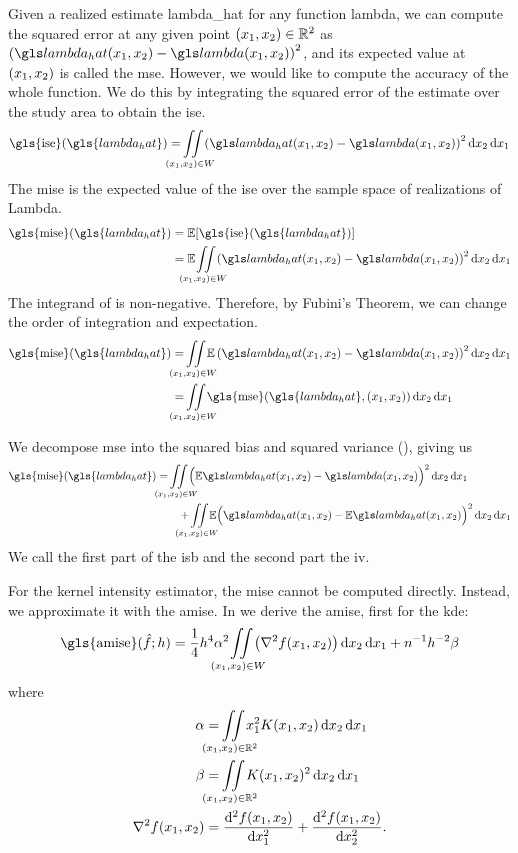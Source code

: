 Given a realized estimate \gls{lambda_hat} for any function \gls{lambda},
we can compute the squared error at any given point $(x_1, x_2) \in \mathbb{R}^2$ as
$\left( \lmbdhat - \lmbd \right)^2$,
and its expected value at $(x_1, x_2)$ is called the \gls{mse}.
However,
we would like to compute the accuracy of the whole function.
We do this by integrating the squared error of the estimate over the study area to obtain the \gls{ise}.
\begin{equation}
\label{eq:ise}
    \mbox{\gls{ise}}(\gls{lambda_hat}) = \iintW{
            \left( \lmbdhat - \lmbd \right)^2
    }
\end{equation}
The \gls{mise} is the expected value of the \gls{ise} over the sample space of realizations of \gls{Lambda}.
\begin{align}
    \mbox{\gls{mise}}(\gls{lambda_hat}) 
        & = \E [\mbox{\gls{ise}}(\gls{lambda_hat})] \nonumber \\
        & = \E \iintW{ \left( \lmbdhat - \lmbd \right)^2 } \label{eq:mise}
\end{align}
The integrand of  is non-negative.
Therefore, by Fubini's Theorem, we can change the order of integration and expectation.
\begin{align}
    \mbox{\gls{mise}}(\gls{lambda_hat}) 
        & = \iintW{ \E \left( \lmbdhat - \lmbd \right)^2 } \nonumber \\
        & = \iintW{ \mbox{\gls{mse}}(\gls{lambda_hat}, \xvec) } \nonumber
\end{align}

We decompose \gls{mse} into the squared bias and squared variance (),
giving us
\begin{align}
    \mbox{\gls{mise}}(\gls{lambda_hat}) 
        & = \iintW{ \Big( \E\lmbdhat - \lmbd \Big)^2 } \nonumber \\
        & \qquad + \iintW{ \E \Big( \lmbdhat - \E\lmbdhat \Big)^2 } \label{eq:mise:intbiasvariance}
\end{align}
We call the first part of  the \gls{isb} and the second part the \gls{iv}.

For the \gls{kernel intensity estimator},
the \gls{mise} cannot be computed directly.
Instead,
we approximate it with the \gls{amise}.
In  we derive the \gls{amise},
first for the \gls{kde}:
\begin{equation}
    \mbox{\gls{amise}}(\hat{f}; h) = 
        \frac{1}{4} h^{4} \alpha^2 \iintW{\left( \nabla^2 f \xvec \right) } +
        n^{-1} h^{-2} \beta \label{eq:amise}
\end{equation}
where
\begin{align}
    \alpha & = \iintR{x_1^2 K(x_1,x_2)} \\
    \beta & = \iintR{K(x_1,x_2)^2} \\
    \nabla^2 f \xvec & = \frac{\diffsq{f}\xvec}{\diff{x_1^2}} + \frac{\diffsq{f}\xvec}{\diff{x_2^2}} \text{.}
\end{align}


